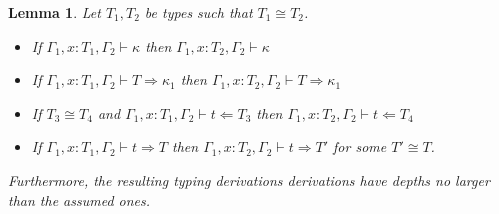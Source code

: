 \documentclass{article}
\newcommand{\tpcheck}[0]{\Leftarrow}
\newcommand{\tpsynth}[0]{\Rightarrow}
\newtheorem{lemma}[theorem]{Lemma}
\begin{document}
\begin{lemma}
  \label{lem:ctxt-conv-class2}
  Let \(T_1,T_2\) be types such that \(T_1 \cong T_2\).
  \begin{itemize}
  \item If \(\Gamma_1,x:T_1,\Gamma_2 \vdash \kappa\) then
    \(\Gamma_1,x:T_2,\Gamma_2 \vdash \kappa\) 
    
  \item If \(\Gamma_1,x:T_1,\Gamma_2 \vdash T \tpsynth \kappa_1\) then
    \(\Gamma_1,x:T_2,\Gamma_2 \vdash T \tpsynth \kappa_1\)

    
  \item If \(T_3 \cong T_4\) and \(\Gamma_1,x:T_1,\Gamma_2 \vdash t \tpcheck T_3\) then
    \(\Gamma_1,x:T_2,\Gamma_2 \vdash t \tpcheck T_4\)
    
  \item If \(\Gamma_1,x:T_1,\Gamma_2 \vdash t \tpsynth T\) then
    \(\Gamma_1,x:T_2,\Gamma_2 \vdash t \tpsynth T'\) for some \(T' \cong T\).

  \end{itemize}
  Furthermore, the resulting typing derivations derivations have depths no
  larger than the assumed ones.
\end{lemma}
\end{document}
